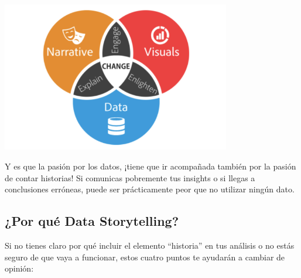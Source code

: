 \documentclass[preprint,12pt]{elsarticle}
\begin{document}
	\begin{center}
	\includegraphics[width=10cm]{./Imagenes/imagen2} 
	\end{center}
Y es que la pasión por los datos, ¡tiene que ir acompañada también por la pasión de contar historias! Si comunicas pobremente tus insights o si llegas a conclusiones erróneas, puede ser prácticamente peor que no utilizar ningún dato.

\subsection{¿Por qué Data Storytelling?}
Si no tienes claro por qué incluir el elemento “historia” en tus análisis o no estás seguro de que vaya a funcionar, estos cuatro puntos te ayudarán a cambiar de opinión:
\end{document}
